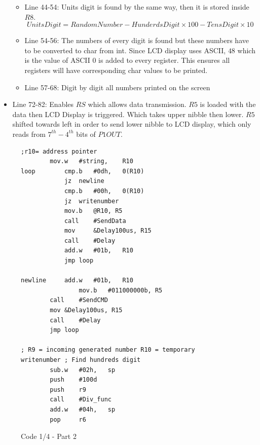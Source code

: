 \documentclass[pdftex,12pt,a4paper]{article}
\begin{document}
\begin{itemize}
\begin{itemize}
        \item Line 44-54: Units digit is found by the same way, then it is stored inside $R8$.
        \[UnitsDigit = RandomNumber - HunderdsDigit \times 100 - TensDigit \times 10\]
        \item Line 54-56: The numbers of every digit is found but these numbers have to be converted to char from int. Since LCD display uses ASCII, $48$ which is the value of ASCII $0$ is added to every register. This ensures all registers will have corresponding char values to be printed.
        \item Line 57-68: Digit by digit all numbers printed on the screen
    \end{itemize}
    \item Line 72-82: Enables $RS$ which allows data transmission. $R5$ is loaded with the data then LCD Display is triggered. Which takes upper nibble then lower. $R5$ shifted towards left in order to send lower nibble to LCD display, which only reads from $7^{th}-4^{th}$ bits of $P1OUT$. 
    
    
\end{itemize}

\begin{figure}[H]
    \centering
    \begin{lstlisting}[language={[x86masm]Assembler}]
;r10= address pointer
		mov.w	#string,	R10
loop		cmp.b   #0dh,	0(R10)
          	jz	newline
          	cmp.b	#00h,	0(R10)
          	jz	writenumber
          	mov.b	@R10, R5
          	call    #SendData
          	mov     &Delay100us, R15
          	call    #Delay
          	add.w	#01b,	R10
          	jmp	loop

newline		add.w	#01b,	R10
                mov.b   #011000000b, R5
		call    #SendCMD
		mov &Delay100us, R15
		call    #Delay
		jmp	loop

; R9 = incoming generated number R10 = temporary
writenumber	; Find hundreds digit
		sub.w	#02h,	sp
		push	#100d
		push	r9
		call	#Div_func
		add.w	#04h,	sp
		pop     r6
    \end{lstlisting}
    \label{code:part1delay}
    \caption{Code 1/4 - Part 2}
\end{figure}
\end{document}
